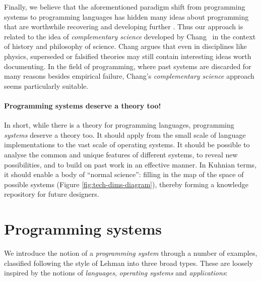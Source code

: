 Finally, we believe that the aforementioned paradigm shift from
programming systems to programming languages has hidden many ideas about
programming that are worthwhile recovering and developing further
\cite{ComplementaryBasic}. Thus our approach is related to the idea of
\emph{complementary science} developed by Chang~\cite{Chang} in the
context of history and philosophy of science. Chang argues that even in
disciplines like physics, superseded or falsified theories may still
contain interesting ideas worth documenting. In the field of
programming, where past systems are discarded for many reasons besides
empirical failure, Chang's \emph{complementary science} approach seems
particularly suitable.

\paragraph{Programming systems deserve a theory too!}

In short, while there is a theory for programming languages, programming
\emph{systems} deserve a theory too. It should apply from the small
scale of language implementations to the vast scale of operating
systems. It should be possible to analyse the common and unique features
of different systems, to reveal new possibilities, and to build on past
work in an effective manner. In Kuhnian terms, it should enable a body
of ``normal science'': filling in the map of the space of possible
systems (Figure \ref{fig:tech-dims-diagram}), thereby forming a
knowledge repository for future designers.

\hypertarget{programming-systems}{%
\section{Programming systems}\label{programming-systems}}

We introduce the notion of a \emph{programming system} through a number
of examples, classified following the style of Lehman \cite{SPEPrograms}
into three broad types. These are loosely inspired by the notions of
\emph{languages}, \emph{operating systems} and \emph{applications}:

